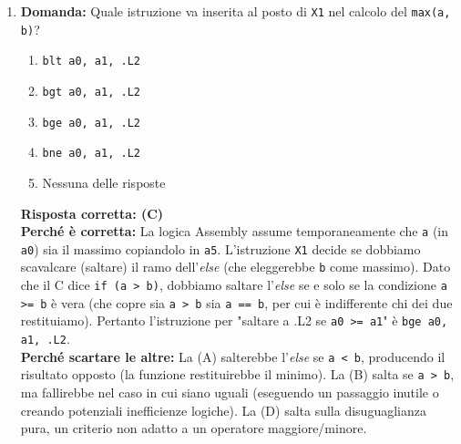 \documentclass[12pt, a4paper]{article}
\begin{document}
\begin{enumerate}
    \item \textbf{Domanda:} Quale istruzione va inserita al posto di \texttt{X1} nel calcolo del \texttt{max(a, b)}?
    \begin{enumerate}[label=(\Alph*)]
        \item \texttt{blt a0, a1, .L2}
        \item \texttt{bgt a0, a1, .L2}
        \item \texttt{bge a0, a1, .L2}
        \item \texttt{bne a0, a1, .L2}
        \item Nessuna delle risposte
    \end{enumerate}
    \textbf{Risposta corretta: (C)} \\
    \textbf{Perché è corretta:} La logica Assembly assume temporaneamente che \texttt{a} (in \texttt{a0}) sia il massimo copiandolo in \texttt{a5}. L'istruzione \texttt{X1} decide se dobbiamo scavalcare (saltare) il ramo dell'\textit{else} (che eleggerebbe \texttt{b} come massimo). Dato che il C dice \texttt{if (a > b)}, dobbiamo saltare l'\textit{else} se e solo se la condizione \texttt{a >= b} è vera (che copre sia \texttt{a > b} sia \texttt{a == b}, per cui è indifferente chi dei due restituiamo). Pertanto l'istruzione per "saltare a .L2 se \texttt{a0 >= a1}" è \texttt{bge a0, a1, .L2}. \\
    \textbf{Perché scartare le altre:} La (A) salterebbe l'\textit{else} se \texttt{a < b}, producendo il risultato opposto (la funzione restituirebbe il minimo). La (B) salta se \texttt{a > b}, ma fallirebbe nel caso in cui siano uguali (eseguendo un passaggio inutile o creando potenziali inefficienze logiche). La (D) salta sulla disuguaglianza pura, un criterio non adatto a un operatore maggiore/minore.


\end{enumerate}
\end{document}
